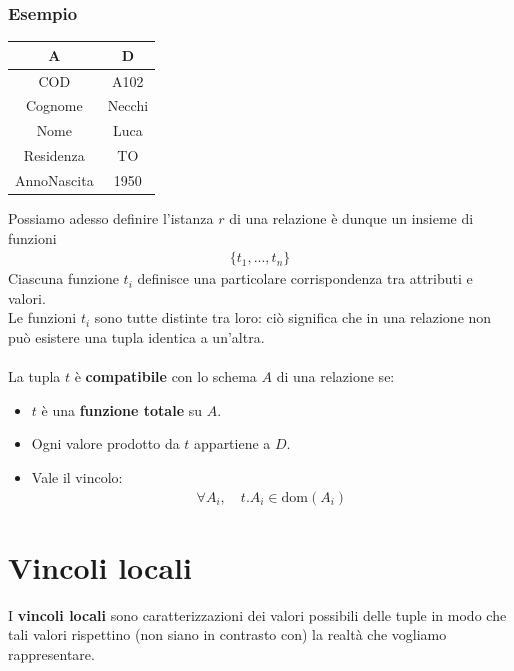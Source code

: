 \subsubsection{Esempio}
    \begin{center}\begin{tabular}{|c|c|} \hline
        \textbf{A} & \textbf{D}\\ \hline
        COD & A102 \\ \hline
        Cognome & Necchi \\ \hline
        Nome & Luca \\ \hline
        Residenza & TO \\ \hline
        AnnoNascita & 1950 \\ \hline
    \end{tabular}\end{center}
Possiamo adesso definire l'istanza $r$ di una relazione è dunque un insieme di funzioni
    \begin{equation}\begin{aligned}
        \{  t_1, ..., t_n   \}
    \end{aligned}\end{equation}
Ciascuna funzione $t_i$ definisce una particolare corrispondenza tra attributi e valori.\\
Le funzioni $t_i$ sono tutte distinte tra loro: ciò significa che in una relazione non può esistere una tupla identica a un'altra.\\\\
La tupla $t$ è \textbf{compatibile} con lo schema $A$ di una relazione se:
    \begin{itemize}
        \item{$t$ è una \textbf{funzione totale} su $A$.}
        \item{Ogni valore prodotto da $t$ appartiene a $D$.}
        \item{Vale il vincolo:
            \begin{equation}\begin{aligned}
                \forall A_i, \quad t.A_i \in \text{dom}(A_i)
            \end{aligned}\end{equation}}
    \end{itemize}

\section{Vincoli locali}
I \textbf{vincoli locali} sono caratterizzazioni dei valori possibili delle tuple in modo che tali valori rispettino (non siano in contrasto con) la realtà che vogliamo rappresentare.

